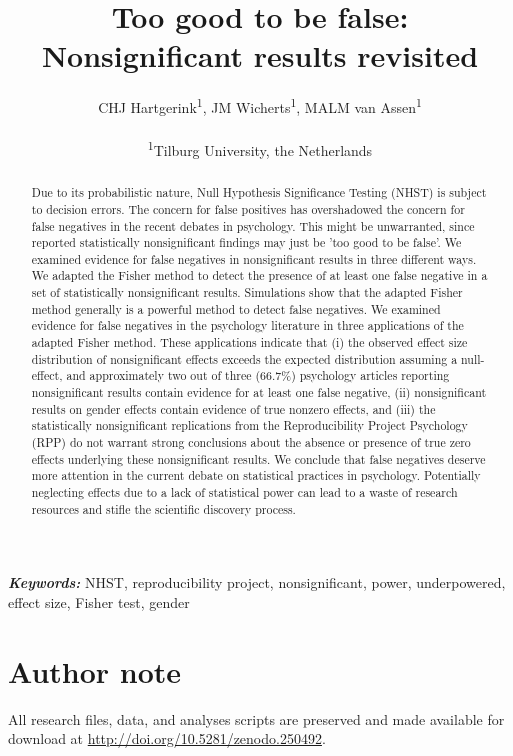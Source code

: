 \documentclass{article}
\title{Too good to be false: Nonsignificant results revisited}
\author{CHJ Hartgerink\textsuperscript{1}, JM Wicherts\textsuperscript{1}, MALM van Assen\textsuperscript{1}\\ \\
\textsuperscript{1}Tilburg University, the Netherlands}
\providecommand{\keywords}[1]{\textbf{\textit{Keywords:}} #1}
\begin{document}

\maketitle

\begin{abstract}
Due to its probabilistic nature, Null Hypothesis Significance Testing (NHST) is subject to decision errors. The concern for false positives has overshadowed the concern for false negatives in the recent debates in psychology. This might be unwarranted,  since  reported statistically nonsignificant findings may just be 'too good to be false'. We examined evidence for false negatives in nonsignificant results in three different ways. We adapted the Fisher method to detect the presence of at least one false negative in a set of statistically nonsignificant results. Simulations show that the adapted Fisher method generally is a powerful method to detect false negatives. We examined evidence for false negatives in the psychology literature in three applications of the adapted Fisher method. These applications indicate that (i) the observed effect size distribution of nonsignificant effects exceeds the expected distribution assuming a null-effect, and approximately two out of three (66.7\%) psychology articles reporting nonsignificant results contain evidence for at least one false negative, (ii) nonsignificant results on gender effects contain evidence of true nonzero effects, and (iii) the statistically nonsignificant replications from the Reproducibility Project Psychology (RPP) do not warrant strong conclusions about the absence or presence of true zero effects underlying these nonsignificant results. We conclude that false negatives deserve more attention in the current debate on statistical practices in psychology. Potentially neglecting effects due to a lack of statistical power can lead to a waste of research resources and stifle the scientific discovery process.
\end{abstract}

\keywords{NHST, reproducibility project, nonsignificant, power, underpowered, effect size, Fisher test, gender}

\section*{Author note}
All research files, data, and analyses scripts are preserved and made available for download at \url{http://doi.org/10.5281/zenodo.250492}.
\newpage
\end{document}

